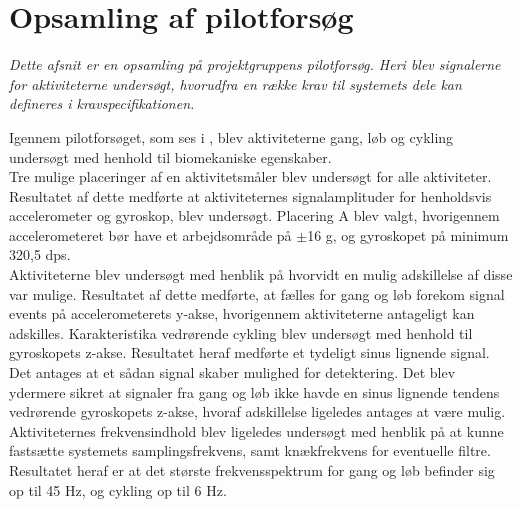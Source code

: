 \section{Opsamling af pilotforsøg}
\textit{Dette afsnit er en opsamling på projektgruppens pilotforsøg. Heri blev signalerne for aktiviteterne undersøgt, hvorudfra en række krav til systemets dele kan defineres i kravspecifikationen.}

Igennem pilotforsøget, som ses i , blev aktiviteterne gang, løb og cykling undersøgt med henhold til biomekaniske egenskaber. \\
Tre mulige placeringer af en aktivitetsmåler blev undersøgt for alle aktiviteter. Resultatet af dette medførte at aktiviteternes signalamplituder for henholdsvis accelerometer og gyroskop, blev undersøgt. Placering A blev valgt, hvorigennem accelerometeret bør have et arbejdsområde på $\pm$16 g, og gyroskopet på minimum 320,5 dps. \\
Aktiviteterne blev undersøgt med henblik på hvorvidt en mulig adskillelse af disse var mulige. Resultatet af dette medførte, at fælles for gang og løb forekom signal events på accelerometerets y-akse, hvorigennem aktiviteterne antageligt kan adskilles. Karakteristika vedrørende cykling blev undersøgt med henhold til gyroskopets z-akse. Resultatet heraf medførte et tydeligt sinus lignende signal. Det antages at et sådan signal skaber mulighed for detektering. Det blev ydermere sikret at signaler fra gang og løb ikke havde en sinus lignende tendens vedrørende gyroskopets z-akse, hvoraf adskillelse ligeledes antages at være mulig. \\
Aktiviteternes frekvensindhold blev ligeledes undersøgt med henblik på at kunne fastsætte systemets samplingsfrekvens, samt knækfrekvens for eventuelle filtre. Resultatet heraf er at det største frekvensspektrum for gang og løb befinder sig op til 45 Hz, og cykling op til 6 Hz. 

